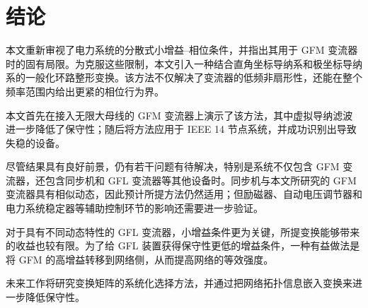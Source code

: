 \section{结论}
\label{sec:conc}

本文重新审视了电力系统的分散式小增益--相位条件，并指出其用于 GFM 变流器时的固有局限。为克服这些限制，本文引入一种结合直角坐标导纳系和极坐标导纳系的一般化环路整形变换。该方法不仅解决了变流器的低频非扇形性，还能在整个频率范围内给出更紧的相位行为界。

本文首先在接入无限大母线的 GFM 变流器上演示了该方法，其中虚拟导纳滤波进一步降低了保守性；随后将方法应用于 IEEE 14 节点系统，并成功识别出导致失稳的设备。

尽管结果具有良好前景，仍有若干问题有待解决，特别是系统不仅包含 GFM 变流器，还包含同步机和 GFL 变流器等其他设备时。同步机与本文所研究的 GFM 变流器具有相似动态，因此预计所提方法仍然适用；但励磁器、自动电压调节器和电力系统稳定器等辅助控制环节的影响还需要进一步验证。

对于具有不同动态特性的 GFL 变流器，小增益条件更为关键，所提变换能够带来的收益也较有限。为了给 GFL 装置获得保守性更低的增益条件，一种有益做法是将 GFM 的高增益转移到网络侧，从而提高网络的等效强度。

未来工作将研究变换矩阵的系统化选择方法，并通过把网络拓扑信息嵌入变换来进一步降低保守性。
